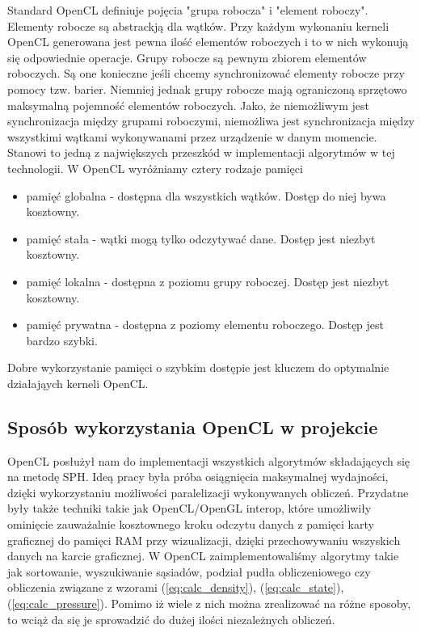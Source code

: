\documentclass[polish, 12pt]{aghthesis}
\begin{document}
			Standard OpenCL definiuje pojęcia "grupa robocza" i "element roboczy". Elementy robocze są abstrackją dla wątków. Przy każdym wykonaniu kerneli OpenCL generowana jest pewna ilość elementów roboczych i to w nich wykonują się odpowiednie operacje. Grupy robocze są pewnym zbiorem elementów roboczych. Są one konieczne jeśli chcemy synchronizować elementy robocze przy pomocy tzw. barier. Niemniej jednak grupy robocze mają ograniczoną sprzętowo maksymalną pojemność elementów roboczych. Jako, że niemożliwym jest synchronizacja między grupami roboczymi, niemożliwa jest synchronizacja między wszystkimi wątkami wykonywanami przez urządzenie w danym momencie. Stanowi to jedną z największych przeszkód w implementacji algorytmów w tej technologii. W OpenCL wyróżniamy cztery rodzaje pamięci 
			\begin{itemize}
				\item pamięć globalna - dostępna dla wszystkich wątków. Dostęp do niej bywa kosztowny.
				\item pamięć stała - wątki mogą tylko odczytywać dane. Dostęp jest niezbyt kosztowny.
				\item pamięć lokalna - dostępna z poziomu grupy roboczej. Dostęp jest niezbyt kosztowny.
				\item pamięć prywatna - dostępna z poziomy elementu roboczego. Dostęp jest bardzo szybki.
			\end{itemize}
			Dobre wykorzystanie pamięci o szybkim dostępie jest kluczem do optymalnie działająych kerneli OpenCL. 
		
		\subsection{Sposób wykorzystania OpenCL w projekcie}
			OpenCL posłużył nam do implementacji wszystkich algorytmów składających się na metodę SPH. Ideą pracy była próba osiągnięcia maksymalnej wydajności, dzięki wykorzystaniu możliwości paralelizacji wykonywanych obliczeń. Przydatne były także techniki takie jak OpenCL/OpenGL interop, które umożliwiły ominięcie zauważalnie kosztownego kroku odczytu danych z pamięci karty graficznej do pamięci RAM przy wizualizacji, dzięki przechowywaniu wszyskich danych na karcie graficznej. W OpenCL zaimplementowaliśmy algorytmy takie jak sortowanie, wyszukiwanie sąsiadów, podział pudła obliczeniowego czy obliczenia związane z wzorami (\ref{eq:calc_density}), (\ref{eq:calc_state}), (\ref{eq:calc_pressure}). Pomimo iż wiele z nich można zrealizować na różne sposoby, to wciąż da się je sprowadzić do dużej ilości niezależnych obliczeń.	
			
\end{document}
